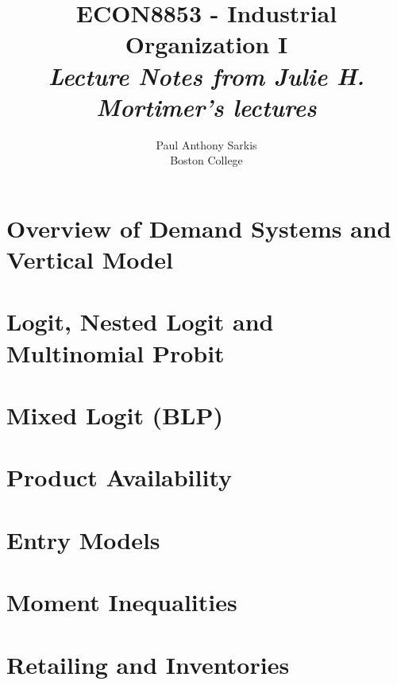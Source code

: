 \documentclass[12pt]{report}
\begin{document}
\date{}
\title{\textbf{\huge{ECON8853 - Industrial Organization I}}\\ \textit{Lecture Notes from Julie H. Mortimer's lectures}}
\author{Paul Anthony Sarkis\\ Boston College} 
 
\maketitle

\tableofcontents


\chapter{Overview of Demand Systems and Vertical Model}


\chapter{Logit, Nested Logit and Multinomial Probit}



\chapter{Mixed Logit (BLP)}


\chapter{Product Availability}


\chapter{Entry Models}


\chapter{Moment Inequalities}


\chapter{Retailing and Inventories}

\end{document}
